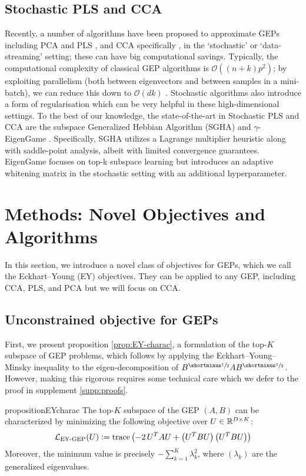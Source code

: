 \subsection{Stochastic PLS and CCA}
Recently, a number of algorithms have been proposed to approximate GEPs including PCA and PLS \citep{arora2012stochastic}, and CCA specifically \citep{bhatia2018gen}, in the `stochastic' or `data-streaming' setting; these can have big computational savings.
Typically, the computational complexity of classical GEP algorithms is $\mathcal{O}\left((n + k)p^2\right)$; by exploiting parallelism (both between eigenvectors and between samples in a mini-batch), we can reduce this down to $\mathcal{O}\left(d k \right)$ \citep{arora2016stochastic}.
Stochastic algorithms also introduce a form of regularisation which can be very helpful in these high-dimensional settings.
To the best of our knowledge, the state-of-the-art in Stochastic PLS and CCA are the subspace Generalized Hebbian Algorithm (SGHA) \citep{chen2019constrained} and $\gamma$-EigenGame \citep{gemp20,gemp2021}.
Specifically, SGHA utilizes a Lagrange multiplier heuristic along with saddle-point analysis, albeit with limited convergence guarantees.
EigenGame focuses on top-k subspace learning but introduces an adaptive whitening matrix in the stochastic setting with an additional hyperparameter.

\section{Methods: Novel Objectives and Algorithms}\label{sec:contributions}

In this section, we introduce a novel class of objectives for GEPs, which we call the Eckhart--Young (EY) objectives. They can be applied to any GEP, including CCA, PLS, and PCA but we will focus on CCA.

\subsection{Unconstrained objective for GEPs}\label{sec:gep-ey-formulation}
First, we present proposition \ref{prop:EY-charac}, a formulation of the top-$K$ subspace of GEP problems, which follows by applying the Eckhart--Young--Minsky inequality \citep{stewart_matrix_1990} to the eigen-decomposition of $B^\mhalf A B^\mhalf$. However, making this rigorous requires some technical care which we defer to the proof in supplement \ref{supp:proofs}.

\begin{restatable}{proposition}{EYcharac}
    \label{prop:EY-charac}
    The top-$K$ subspace of the GEP $(A,B)$ can be characterized by minimizing the following objective over $U \in \mathbb{R}^{D \times K}$:
    \begin{align}\label{eq:EY-charac}
    \mathcal{L}_\text{EY-GEP}(U) \vcentcolon= \operatorname{trace} \left( - 2\,U^T A U + \left(U^T B U\right) \left(U^T B U\right) \right)
    \end{align}
    Moreover, the minimum value is precisely $- \sum_{k=1}^K \lambda_k^2$, where $(\lambda_k)$ are the generalized eigenvalues.
\end{restatable}

